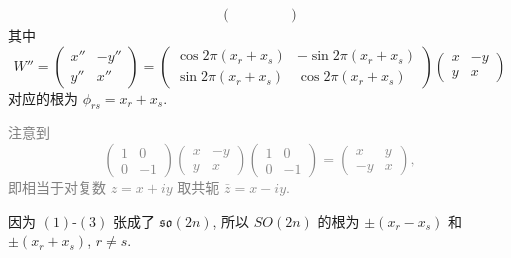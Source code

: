 \begin{example}[偶数阶特殊正交群 $SO(2n)$]
\begin{align*}
\begin{pmatrix}
        & & & &
        \end{pmatrix}
    \end{align*}
    其中
    \begin{equation*}
        W'' = 
        \begin{pmatrix}
            x'' & -y'' \\ y'' & x''
        \end{pmatrix} = 
        \begin{pmatrix}
            \cos 2\pi (x_r + x_s) & -\sin 2\pi (x_r + x_s) \\
            \sin 2\pi (x_r + x_s) & \cos 2\pi (x_r + x_s)
        \end{pmatrix}
        \begin{pmatrix}
            x & -y \\ y & x
        \end{pmatrix}
    \end{equation*}
    对应的根为 $\phi_{rs} = x_r + x_s$.

    \textcolor{gray}{
    \begin{remark}
        注意到
        \begin{equation*}
            \begin{pmatrix}
                1 & 0 \\ 0 & -1
            \end{pmatrix} 
            \begin{pmatrix}
                x & -y \\ y & x
            \end{pmatrix} 
            \begin{pmatrix}
                1 & 0 \\ 0 & -1
            \end{pmatrix} = 
            \begin{pmatrix}
                x & y \\ -y & x
            \end{pmatrix},
        \end{equation*}
        即相当于对复数 $z = x + iy$ 取共轭 $\bar{z} = x - iy$.
    \end{remark}}

    因为 $(1)$-$(3)$ 张成了 $\mathfrak{so}(2n)$, 
    所以 $SO(2n)$ 的根为 $\pm(x_r - x_s)$ 和 $\pm(x_r + x_s)$, $r\neq s$.
\end{example}
